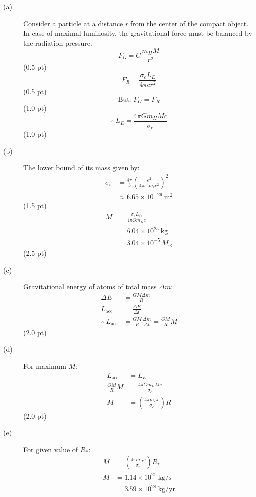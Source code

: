 \begin{description}
\item[(a)] Consider a particle at a distance $r$ from the center of the
  compact object. In case of maximal luminosity, the gravitational force must
  be balanced by the radiation pressure.
  \[ F_G = G\frac{m_H M}{r^2} \]
  \hfill(0.5 pt)
  \[ F_R = \frac{\sigma_e L_E}{4\pi c r^2} \]
  \hfill(0.5 pt)
  \[ \text{But, } F_G = F_R \]
  \hfill(1.0 pt)
  \[ \therefore\ L_E = \frac{4\pi G m_H M c}{\sigma_e} \]
  \hfill(1.0 pt)
\item[(b)] The lower bound of its mass given by:
  \begin{align*}
    \sigma_e &= \frac{8\pi}{3}
      \left(\frac{e^2}{4\pi\varepsilon_0 m_e c^2}\right)^2\\
    &\approx 6.65 \times 10^{-29}\ \mathrm{m}^2
  \end{align*}
  \hfill(1.5 pt)
  \begin{align*}
    M &= \frac{\sigma_e L_\odot}{4\pi G m_H c}\\
      &= 6.04 \times 10^{25}\ \mathrm{kg}\\
      &= 3.04 \times 10^{-5}\,M_\odot
  \end{align*}
  \hfill(2.5 pt)
\item[(c)] Gravitational energy of atoms of total mass $\Delta m$:
  \begin{align*}
    \Delta E &= \frac{GM\Delta m}{R}\\
    L_{\mathrm{acc}} &= \frac{\Delta E}{\Delta t}\\
    \therefore\ L_{\mathrm{acc}} &= \frac{GM}{R}\frac{\Delta m}{\Delta t}
      = \frac{GM}{R}\dot{M}
  \end{align*}
  \hfill(2.0 pt)
\item[(d)] For maximum $\dot{M}$:
  \begin{align*}
    L_{\mathrm{acc}} &= L_E\\
    \frac{GM}{R}\dot{M} &= \frac{4\pi G m_H M c}{\sigma_e}\\
    \dot{M} &= \left(\frac{4\pi m_H c}{\sigma_e}\right) R
  \end{align*}
  \hfill(2.0 pt)
\item[(e)] For given value of $R_*$:
  \begin{align*}
    \dot{M} &= \left(\frac{4\pi m_H c}{\sigma_e}\right) R_*\\
    \dot{M} &= 1.14 \times 10^{21}\ \mathrm{kg/s}\\
      &= 3.59 \times 10^{28}\ \mathrm{kg/yr}\\

\end{align*}
\end{description}

